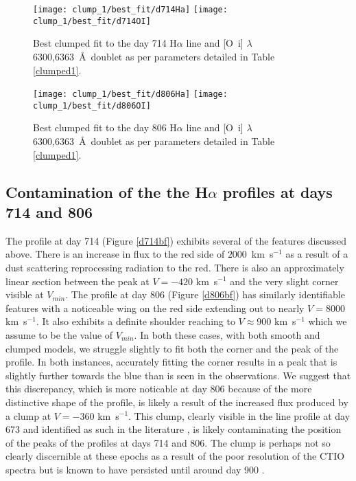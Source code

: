  \begin{figure*}
\begin{center}
\texttt{[image: clump\_1/best\_fit/d714Ha]}
\texttt{[image: clump\_1/best\_fit/d714OI]}
\caption{Best clumped fit to the day 714 H$\alpha$ line and [O~{\sc i}] 
$\lambda$6300,6363~\AA\ doublet as per parameters detailed in 
Table \ref{clumped1}.}
\label{d714_c}
\end{center}
\end{figure*}
\begin{figure*}
\begin{center}
\texttt{[image: clump\_1/best\_fit/d806Ha]}
\texttt{[image: clump\_1/best\_fit/d806OI]}
\caption{Best clumped fit to the day 806 H$\alpha$ line and 
[O~{\sc i}] $\lambda$6300,6363~\AA\ doublet as per parameters detailed in Table 
\ref{clumped1}.}
\label{d806_c}
\end{center}
\end{figure*}


\subsection{Contamination of the the H$\alpha$ profiles at days 714 and 806}

The profile at day 714 (Figure \ref{d714bf}) exhibits several of the features discussed above.  
There is an increase in flux to the red side of $2000$~km~s$^{-1}$ 
as a result of a dust scattering reprocessing radiation to the red.  
There is also an approximately linear section between the peak at $V=-420$ 
km~s$^{-1}$ and the very slight corner visible at $V_{min}$.  The profile 
at day 806 (Figure \ref{d806bf}) has similarly identifiable features with a noticeable wing on 
the red side extending out to nearly $V=8000$ km~s$^{-1}$.  It also exhibits a 
definite shoulder reaching to $V \approx 900$ km~s$^{-1}$ which we assume 
to be the value of $V_{min}$.  In both these cases, with both smooth and 
clumped models, we struggle slightly to fit both the corner and the peak 
of the profile.  In both instances, accurately fitting the corner results 
in a peak that is slightly further towards the blue than is seen in the 
observations.  We suggest that this discrepancy, which is more noticable 
at day 806 because of the more distinctive shape of the profile, is likely 
a result of the increased flux produced by a clump at $V=-360$ 
km~s$^{-1}$.  This clump, clearly visible in the line profile at day 673 
and identified as such in the literature 
\citep{Spyromilio1993a,Hanuschik1993}, is likely contaminating the 
position of the peaks of the profiles at days 714 and 806.  The clump is 
perhaps not so clearly discernible at these epochs as a result of the poor 
resolution of the CTIO spectra but is known to have persisted until around day 
900 \citep{Hanuschik1993}.


